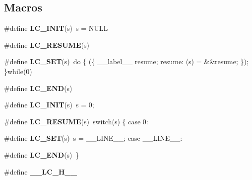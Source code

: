 \subsection*{Macros}
\begin{DoxyCompactItemize}
\item 
\hypertarget{group__lc_ga2c1bb4fa6d7a6ff951a41c73fc721109}{\#define {\bfseries L\-C\-\_\-\-I\-N\-I\-T}(s)~s = N\-U\-L\-L}\label{group__lc_ga2c1bb4fa6d7a6ff951a41c73fc721109}

\item 
\#define {\bfseries L\-C\-\_\-\-R\-E\-S\-U\-M\-E}(s)
\item 
\hypertarget{group__lc_gad8eec328a4868d767f0c00c8d1c6cfc1}{\#define {\bfseries L\-C\-\_\-\-S\-E\-T}(s)~do \{ (\{ \-\_\-\-\_\-label\-\_\-\-\_\- resume; resume\-: (s) = \&\&resume; \}); \}while(0)}\label{group__lc_gad8eec328a4868d767f0c00c8d1c6cfc1}

\item 
\hypertarget{group__lc_gaca51ceb2f5d855dfde55bcedf8d3b92d}{\#define {\bfseries L\-C\-\_\-\-E\-N\-D}(s)}\label{group__lc_gaca51ceb2f5d855dfde55bcedf8d3b92d}

\item 
\hypertarget{group__lc_ga2c1bb4fa6d7a6ff951a41c73fc721109}{\#define {\bfseries L\-C\-\_\-\-I\-N\-I\-T}(s)~s = 0;}\label{group__lc_ga2c1bb4fa6d7a6ff951a41c73fc721109}

\item 
\hypertarget{group__lc_ga1ec8b8f4710dce1fa7fb87d3a31541ae}{\#define {\bfseries L\-C\-\_\-\-R\-E\-S\-U\-M\-E}(s)~switch(s) \{ case 0\-:}\label{group__lc_ga1ec8b8f4710dce1fa7fb87d3a31541ae}

\item 
\hypertarget{group__lc_gad8eec328a4868d767f0c00c8d1c6cfc1}{\#define {\bfseries L\-C\-\_\-\-S\-E\-T}(s)~s = \-\_\-\-\_\-\-L\-I\-N\-E\-\_\-\-\_\-; case \-\_\-\-\_\-\-L\-I\-N\-E\-\_\-\-\_\-\-:}\label{group__lc_gad8eec328a4868d767f0c00c8d1c6cfc1}

\item 
\hypertarget{group__lc_gaca51ceb2f5d855dfde55bcedf8d3b92d}{\#define {\bfseries L\-C\-\_\-\-E\-N\-D}(s)~\}}\label{group__lc_gaca51ceb2f5d855dfde55bcedf8d3b92d}

\item 
\hypertarget{group__lc_ga28687499cf5b5681fb09ba1c184e09a8}{\#define {\bfseries \-\_\-\-\_\-\-L\-C\-\_\-\-H\-\_\-\-\_\-}}\label{group__lc_ga28687499cf5b5681fb09ba1c184e09a8}

\end{DoxyCompactItemize}
